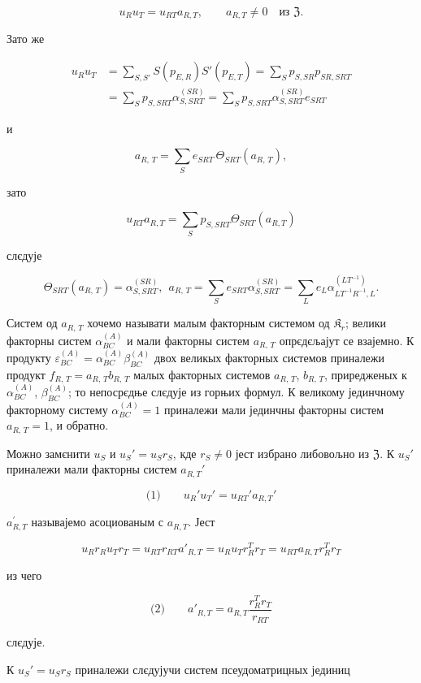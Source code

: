 \documentclass[11pt]{article}
\begin{document}
\[
u_Ru_T=u_{RT}a_{R,T},\qquad a_{R,T}\ne0\quad\text{из }\mathfrak Z.
\]

Зато же

\[
\begin{aligned}
u_Ru_T
&=\sum_{S,S'} S(p_{E,R})S'(p_{E,T})
=\sum_S p_{S,SR}p_{SR,SRT}\\
&=\sum_S p_{S,SRT}\alpha_{S,SRT}^{(SR)}
=\sum_S p_{S,SRT}\alpha_{S,SRT}^{(SR)}e_{SRT}
\end{aligned}
\]

и

\[a_{R,\,T} = \sum\limits_{S} e_{SRT}\, \Theta_{SRT} \left(a_{R,\,T}\right),\]

зато

\[u_{RT} a_{R,T} = \sum\limits_{S} p_{S,SRT} \Theta_{SRT} (a_{R,T})\]

слєдује

\[\Theta_{SRT}(a_{R,\,T}) = \alpha_{S,SRT}^{(SR)}, ~~ a_{R,\,T} = \sum\limits_{S} e_{SRT} \alpha_{S,SRT}^{(SR)} = \sum\limits_{L} e_{L} \alpha_{LT^{-1}R^{-1},L}^{(LT^{-1})}.\]

Систем од \(a_{R,\,T}\) хочемо называти малым факторным системом од \(\mathfrak K_r\); велики факторны систем \(\alpha_{BC}^{(A)}\) и мали факторны систем \(a_{R,\,T}\) опрєдєљајут се взајемно. К продукту \(\varepsilon_{BC}^{(A)} = \alpha_{BC}^{(A)} \beta_{BC}^{(A)}\) двох великых факторных системов приналежи продукт \(f_{R,\,T} = a_{R,\,T}b_{R,\,T}\) малых факторных системов \(a_{R,\,T}\), \(b_{R,\,T}\), приредженых к \(\alpha_{BC}^{(A)}\), \(\beta_{BC}^{(A)}\); то непосрєдње слєдује из горњих формул. К великому јединчному факторному систему \(\alpha_{BC}^{(A)} = 1\) приналежи мали јединчны факторны систем \(a_{R,\,T} = 1\), и обратно.

Можно замєнити \(u_S\) и \(u_S'=u_Sr_S\), кде \(r_S\neq 0\) јест избрано либовољно из \(\mathfrak Z\). К \(u_S'\) приналежи мали факторны систем \(a_{R,T}'\)

\[
\text{(1)}\qquad u_R'u_T'=u_{RT}'a_{R,T}'
\]

\(a_{R,T}^{\prime}\) называјемо асоциованым с \(a_{R,T}\). Јест

\[u_R r_R u_T r_T = u_{RT} r_{RT} a'_{R,T} = u_R u_T r_R^T r_T = u_{RT} a_{R,T} r_R^T r_T\]

из чего

\[
\text{(2)}\qquad a'_{R,T}=a_{R,T}\frac{r_R^T r_T}{r_{RT}}
\]

слєдује.

К \(u_S' = u_S r_S\) приналежи слєдујучи систем псеудоматрицных јединиц
\end{document}
